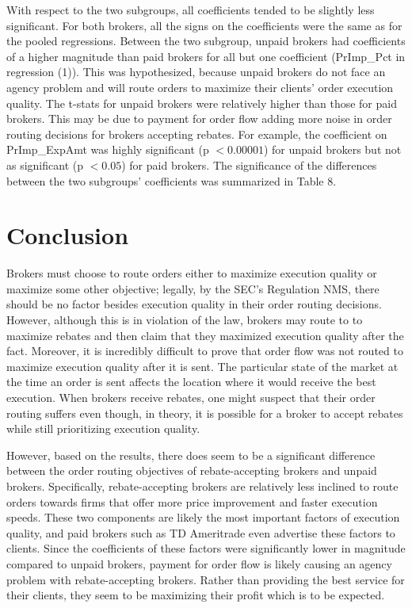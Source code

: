 \documentclass[12pt,a4paper]{article}
\begin{document}
		With respect to the two subgroups, all coefficients tended to be slightly less significant. For both brokers, all the signs on the coefficients were the same as for the pooled regressions. Between the two subgroup, unpaid brokers had coefficients of a higher magnitude than paid brokers for all but one coefficient (PrImp\_Pct in regression (1)). This was hypothesized, because unpaid brokers do not face an agency problem and will route orders to maximize their clients' order execution quality. The t-stats for unpaid brokers were relatively higher than those for paid brokers. This may be due to payment for order flow adding more noise in order routing decisions for brokers accepting rebates. For example, the coefficient on PrImp\_ExpAmt was highly significant (p $< 0.00001$) for unpaid brokers but not as significant (p $< 0.05$) for paid brokers. The significance of the differences between the two subgroups' coefficients was summarized in Table 8. 
	
\pagebreak
		
\section{Conclusion}

	Brokers must choose to route orders either to maximize execution quality or maximize some other objective; legally, by the SEC's Regulation NMS, there should be no factor besides execution quality in their order routing decisions.  However, although this is in violation of the law, brokers may route to to maximize rebates and then claim that they maximized execution quality after the fact. Moreover, it is incredibly difficult to prove that order flow was not routed to maximize execution quality after it is sent. The particular state of the market at the time an order is sent affects the location where it would receive the best execution. When brokers receive rebates, one might suspect that their order routing suffers even though, in theory, it is possible for a broker to accept rebates while still prioritizing execution quality.
	
	However, based on the results, there does seem to be a significant difference between the order routing objectives of rebate-accepting brokers and unpaid brokers. Specifically, rebate-accepting brokers are relatively less inclined to route orders towards firms that offer more price improvement and faster execution speeds. These two components are likely the most important factors of execution quality, and paid brokers such as TD Ameritrade even advertise these factors to clients. Since the coefficients of these factors were significantly lower in magnitude compared to unpaid brokers, payment for order flow is likely causing an agency problem with rebate-accepting brokers. Rather than providing the best service for their clients, they seem to be maximizing their profit which is to be expected. 
\end{document}
